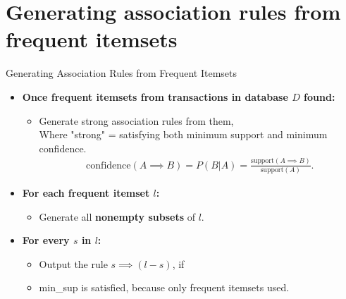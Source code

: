 \section{Generating association rules from frequent itemsets}

\begin{frame}{Generating Association Rules from Frequent Itemsets}
	\begin{itemize}
		\item \textbf{Once frequent itemsets from transactions in
			      database $D$ found:}
		      \begin{itemize}
			      \item Generate strong association rules from them,\\
			            Where "strong" = satisfying both minimum support and
			            minimum confidence.
			            \begin{align*}
				            \text{confidence}(A \implies B) = P(B|A) = \frac{\text{support}(A \implies B)}{\text{support}(A)}.
			            \end{align*}
		      \end{itemize}
		\item \textbf{For each frequent itemset $l$:}
		      \begin{itemize}
			      \item Generate all \textbf{nonempty subsets} of $l$.
		      \end{itemize}
		\item \textbf{For every $s$ in $l$:}
		      \begin{itemize}
			      \item Output the rule $s \implies (l - s)$, if
			      \item min\_sup is satisfied, because only frequent itemsets
			            used.
		      \end{itemize}
	\end{itemize}
\end{frame}
